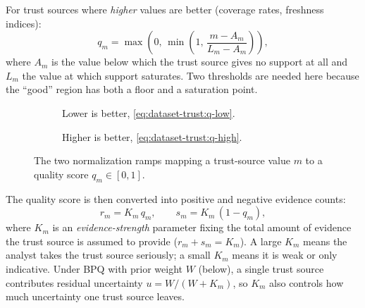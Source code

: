For trust sources where \emph{higher} values are better (coverage rates, freshness indices):
\begin{equation}
q_m = \max\!\left(0,\, \min\!\left(1,\,
        \frac{m - A_m}{L_m - A_m}\right)\right),
\label{eq:dataset-trust:q-high}
\end{equation}
where $A_m$ is the value below which the trust source gives no support at all and $L_m$ the value at which support saturates. Two thresholds are needed here because the ``good'' region has both a floor and a saturation point.

\begin{figure}[!htbp]
  \centering
  \begin{subfigure}{0.46\textwidth}
    \centering
    \caption{Lower is better, \cref{eq:dataset-trust:q-low}.}
  \end{subfigure}
  \hfill
  \begin{subfigure}{0.46\textwidth}
    \centering
    \caption{Higher is better, \cref{eq:dataset-trust:q-high}.}
  \end{subfigure}
  \caption{The two normalization ramps mapping a trust-source value $m$ to a quality score $q_m \in [0,1]$.}
  \label{fig:dataset-trust:ramps}
\end{figure}

The quality score is then converted into positive and negative evidence counts:
\begin{equation}
r_m = K_m \, q_m, \qquad s_m = K_m \, (1 - q_m),
\label{eq:dataset-trust:evidence-counts}
\end{equation}
where $K_m$ is an \emph{evidence-strength} parameter fixing the total amount of evidence the trust source is assumed to provide ($r_m + s_m = K_m$). A large $K_m$ means the analyst takes the trust source seriously; a small $K_m$ means it is weak or only indicative. Under \ac{BPQ} with prior weight $W$ (below), a single trust source contributes residual uncertainty $u = W/(W + K_m)$, so $K_m$ also controls how much uncertainty one trust source leaves.

